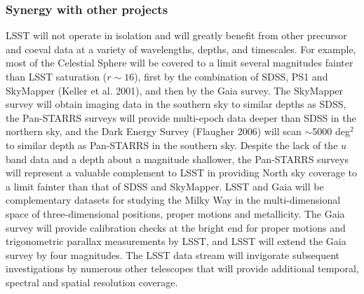 \documentclass{emulateapj}
\begin{document}
\subsubsection{  Synergy with other projects }

LSST will not operate in isolation and will greatly benefit from other precursor and coeval 
data at a variety of wavelengths, depths, and timescales. For example, most of the Celestial 
Sphere will be covered to a limit several magnitudes fainter than LSST saturation 
($r\sim16$), first by the combination of SDSS, PS1 and SkyMapper (Keller et al. 2001), 
and then by the Gaia survey. The SkyMapper survey will obtain imaging data in the southern
sky to similar depths as SDSS, the Pan-STARRS surveys will provide multi-epoch data deeper 
than SDSS in the northern sky, and the Dark Energy Survey (Flaugher 2006) will scan 
$\sim$5000 deg$^2$ to similar depth as Pan-STARRS in the southern sky. Despite the lack of 
the $u$ band data and a depth about a magnitude shallower, the Pan-STARRS surveys
will represent a valuable complement to LSST in providing North sky coverage to a limit 
fainter than that of SDSS and SkyMapper. LSST and Gaia will 
be complementary datasets for studying the Milky Way in the multi-dimensional space of 
three-dimensional positions, proper motions and 
metallicity. The Gaia survey will provide calibration checks at the bright end for proper 
motions and trigonometric parallax measurements by LSST, and LSST will extend the 
Gaia survey by four magnitudes. The LSST data stream will invigorate subsequent 
investigations by numerous other telescopes that will provide 
additional temporal, spectral and spatial resolution coverage. 
\end{document}
